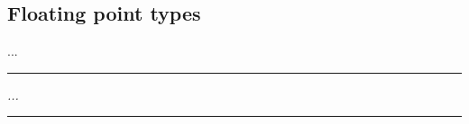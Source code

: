 
    \subsection{Floating point types}

        ...


    \par\noindent\rule{\textwidth}{0.4pt}
    \textit{...}
    \par\noindent\rule{\textwidth}{0.4pt}